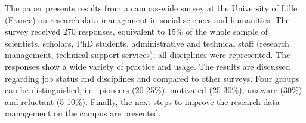 The paper presents results from a campus-wide survey at the University
of Lille (France) on research data management in social sciences and
humanities. The survey received 270 responses, equivalent to 15\% of the
whole sample of scientists, scholars, PhD students, administrative and
technical staff (research management, technical support services); all
disciplines were represented. The responses show a wide variety of
practice and usage. The results are discussed regarding job status and
disciplines and compared to other surveys. Four groups can be
distinguished, i.e.~pioneers (20-25\%), motivated (25-30\%), unaware
(30\%) and reluctant (5-10\%). Finally, the next steps to improve the
research data management on the campus are presented.
